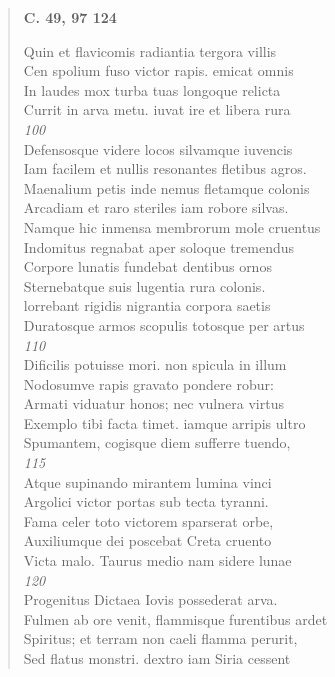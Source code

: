 \documentclass[11pt, a4paper]{report}
\begin{document}
\begin{verse}
    \begin{center} \textbf{C. 49, 97 124} \end{center} \marginpar{[56]} Quin et flavicomis radiantia tergora villis \\ Cen spolium fuso victor rapis. emicat omnis \\ In laudes mox turba tuas longoque relicta \\ Currit in arva metu. iuvat ire et libera rura \\ \textit{100} \\ Defensosque videre locos silvamque iuvencis \\ Iam facilem et nullis resonantes fletibus agros. \\ Maenalium petis inde nemus fletamque colonis \\ Arcadiam et raro steriles iam robore silvas. \\ Namque hic inmensa membrorum mole cruentus \\ Indomitus regnabat aper soloque tremendus \\ Corpore lunatis fundebat dentibus ornos \\ Sternebatque suis lugentia rura colonis. \\ lorrebant rigidis nigrantia corpora saetis \\ Duratosque armos scopulis totosque per artus \\ \textit{110} \\ Dificilis potuisse mori. non spicula in illum \\ Nodosumve rapis gravato pondere robur: \\ Armati viduatur honos; nec vulnera virtus \\ Exemplo tibi facta timet. iamque arripis ultro \\ Spumantem, cogisque diem sufferre tuendo, \\ \textit{115} \\ Atque supinando mirantem lumina vinci \\ Argolici victor portas sub tecta tyranni. \\ Fama celer toto victorem sparserat orbe, \\ Auxiliumque dei poscebat Creta cruento \\ Victa malo. Taurus medio nam sidere lunae \\ \textit{120} \\ Progenitus Dictaea Iovis possederat arva. \\ Fulmen ab ore venit, flammisque furentibus ardet \\ Spiritus; et terram non caeli flamma perurit, \\ Sed flatus monstri. dextro iam Siria cessent \\ 

\end{verse}
\end{document}

